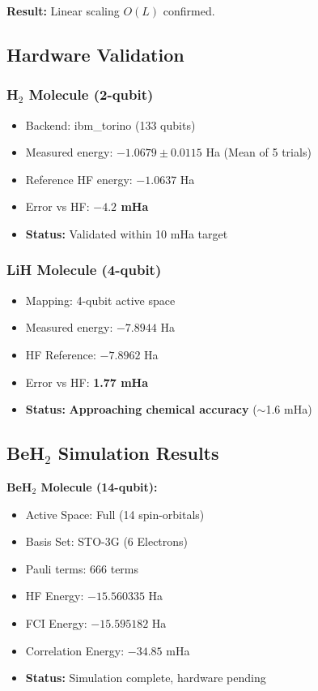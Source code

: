 \documentclass[aps,prx,twocolumn,superscriptaddress,floatfix]{revtex4-2}
\begin{document}
\textbf{Result:} Linear scaling $O(L)$ confirmed.

\subsection{Hardware Validation}

\subsubsection{H$_2$ Molecule (2-qubit)}
\begin{itemize}
    \item Backend: ibm\_torino (133 qubits)
    \item Measured energy: $-1.0679 \pm 0.0115$ Ha (Mean of 5 trials)
    \item Reference HF energy: $-1.0637$ Ha
    \item Error vs HF: \textbf{$-4.2$ mHa}
    \item \textbf{Status:} Validated within 10 mHa target
\end{itemize}

\subsubsection{LiH Molecule (4-qubit)}
\begin{itemize}
    \item Mapping: 4-qubit active space
    \item Measured energy: $-7.8944$ Ha
    \item HF Reference: $-7.8962$ Ha
    \item Error vs HF: \textbf{1.77 mHa}
    \item \textbf{Status:} \textbf{Approaching chemical accuracy} ($\sim$1.6 mHa)
\end{itemize}

\subsection{BeH$_2$ Simulation Results}

\textbf{BeH$_2$ Molecule (14-qubit):}
\begin{itemize}
    \item Active Space: Full (14 spin-orbitals)
    \item Basis Set: STO-3G (6 Electrons)
    \item Pauli terms: 666 terms
    \item HF Energy: $-15.560335$ Ha
    \item FCI Energy: $-15.595182$ Ha
    \item Correlation Energy: $-34.85$ mHa
    \item \textbf{Status:} Simulation complete, hardware pending
\end{itemize}
\end{document}
